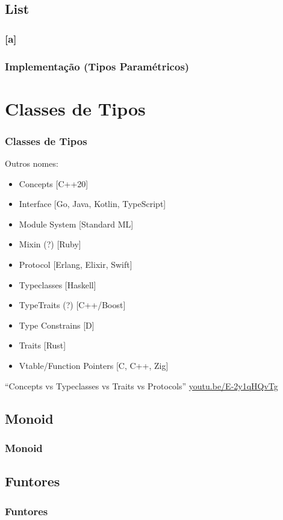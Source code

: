 \documentclass{beamer}
\begin{document}
\subsection{List}
\begin{frame}
    \frametitle{[a]}
\end{frame}

\begin{frame}
    \frametitle{Implementação (Tipos Paramétricos)}
\end{frame}

\section{Classes de Tipos}
\begin{frame}
    \frametitle{Classes de Tipos}
    Outros nomes:
    \begin{itemize}
        \item Concepts [C++20]
        \item Interface [Go, Java, Kotlin, TypeScript]
        \item Module System [Standard ML]
        \item Mixin (?) [Ruby]
        \item Protocol [Erlang, Elixir, Swift]
        \item Typeclasses [Haskell]
        \item TypeTraits (?) [C++/Boost]
        \item Type Constrains [D]
        \item Traits [Rust]
        \item Vtable/Function Pointers [C, C++, Zig]
    \end{itemize}
    \vfill
    ``Concepts vs Typeclasses vs Traits vs Protocols''
    \url{youtu.be/E-2y1qHQvTg}
\end{frame}

\subsection{Monoid}
\begin{frame}
    \frametitle{Monoid}
\end{frame}

\subsection{Funtores}
\begin{frame}
    \frametitle{Funtores}
\end{frame}
\end{document}
